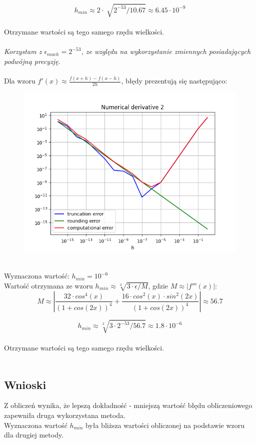 \documentclass{article}
\begin{document}
$$h_{min} \approx 2\cdot\sqrt[]{2^{-53}/10.67}
\approx 6.45 \cdot 10^{-9}$$
\\
Otrzymane wartości są tego samego rzędu wielkości. \\
\\
\textit{Korzystam z $\epsilon_{mach}=2^{-53}$,
 ze względu na wykorzystanie zmiennych posiadających podwójną precyzję.}
\\\\
Dla wzoru $f'(x)\approx\frac{f(x+h)-f(x-h)}{2h}$, błędy prezentują się następująco:
\begin{figure}[ht!]
\includegraphics[width=\linewidth]{figures/numerical_derivative_2.png}
\end{figure}
\\
Wyznaczona wartość: $h_{min} = 10^{-6}$ \\
Wartość otrzymana ze wzoru $h_{min} \approx \sqrt[3]{3\cdot\epsilon/M}$,
gdzie $M \approx \left|f'''(x)\right|$: \\
$$M\approx \left|\frac{32\cdot cos^4(x)}{(1 + cos(2 x))^4} + \frac{16\cdot cos^2(x)\cdot sin^2(2 x)}{(1 + cos(2 x))^4}\right|
\approx 56.7$$

$$h_{min} \approx \sqrt[3]{3\cdot2^{-53}/56.7}
\approx 1.8 \cdot 10^{-6}$$
\\
Otrzymane wartości są tego samego rzędu wielkości.  \\
\\
\subsection*{Wnioski}
Z obliczeń wynika, że lepszą dokładność - mniejszą
wartość błędu obliczeniowego zapewniła druga 
wykorzystana metoda. \\
Wyznaczona wartość $h_{min}$ była bliższa wartości
obliczonej na podstawie wzoru dla drugiej metody.
\\
\end{document}

